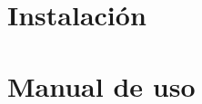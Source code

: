 \newpage
 
\chapter{Instalación}
\label{chap:installation}
\chapter{Manual de uso}
\label{chap:usage}

\newpage
\thispagestyle{empty}
